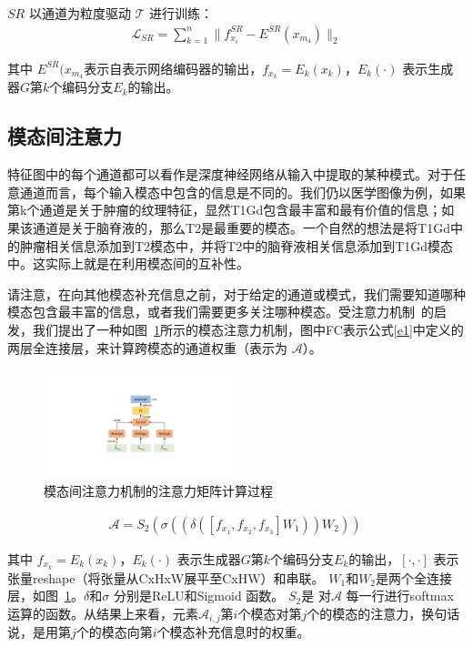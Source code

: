 $SR$ 以通道为粒度驱动 $\mathcal{T}$ 进行训练：
\begin{align}
	\mathcal{L}_{SR} = \sum_{k=1}^n \|f^{SR}_{x_i}- E^{SR}(x_{m_4})\|_2
\end{align}

其中 $E^{SR}(x_{m_4}$表示自表示网络编码器的输出，$f_{x_k}=E_k(x_k)$，$E_k(\cdot)$ 表示生成器$G$第$k$个编码分支$E_k$的输出。

\subsection{模态间注意力}

特征图中的每个通道都可以看作是深度神经网络从输入中提取的某种模式。对于任意通道而言，每个输入模态中包含的信息是不同的。我们仍以医学图像为例，如果第k个通道是关于肿瘤的纹理特征，显然T1Gd包含最丰富和最有价值的信息；如果该通道是关于脑脊液的，那么T2是最重要的模态。一个自然的想法是将T1Gd中的肿瘤相关信息添加到T2模态中，并将T2中的脑脊液相关信息添加到T1Gd模态中。这实际上就是在利用模态间的互补性。

请注意，在向其他模态补充信息之前，对于给定的通道或模式，我们需要知道哪种模态包含最丰富的信息，或者我们需要更多关注哪种模态。受注意力机制~\cite{seq2seq,attentionallyouneed,nonlocal,sagan}的启发，我们提出了一种如图~\ref{f2}所示的模态注意力机制，图中FC表示公式\ref{e1}中定义的两层全连接层，来计算跨模态的通道权重（表示为 $\mathcal{A}$）。

\begin{figure}
	\centering
	\includegraphics[width=0.5\textwidth]{figures/JAGAN/20201109InterAttention_function_AV1_0.pdf}
	\caption[]{模态间注意力机制的注意力矩阵计算过程}
	\label{f2}
\end{figure}

\begin{align}
	\mathcal{A} = S_2(\sigma((\delta([f_{x_1}, f_{x_2}, f_{x_3}]W_1))W_2))\
	\label{e1}
\end{align}

其中 $f_{x_k}=E_k(x_k)$，$E_k(\cdot)$ 表示生成器$G$第$k$个编码分支$E_k$的输出，$[\cdot,\cdot]$ 表示张量reshape（将张量从CxHxW展平至CxHW）和串联。 $W_1$和$W_2$是两个全连接层，如图~\ref{f2}。$\delta$和$\sigma$ 分别是ReLU\cite{nair2010rectified}和Sigmoid 函数。 $S_2$是 对$\mathcal{A}$ 每一行进行softmax运算的函数。从结果上来看，元素$\mathcal{A}_{i,j}$第$i$个模态对第$j$个的模态的注意力，换句话说，是用第$j$个的模态向第$i$个模态补充信息时的权重。

